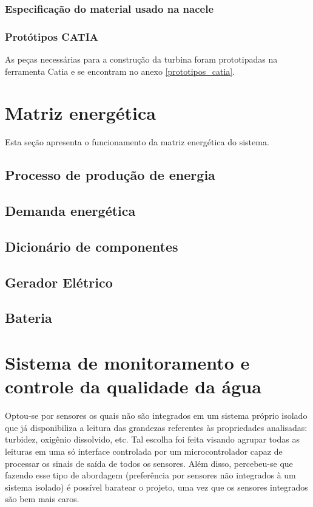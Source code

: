	\subsubsection{Especificação do material usado na nacele}
		
	\subsubsection{Protótipos CATIA}
	  As peças necessárias para a construção da turbina foram prototipadas na ferramenta Catia \textregistered  e se encontram no 
	  anexo \ref{prototipos_catia}.
  
  \vfill
  \pagebreak
  \section{Matriz energética}
      
      Esta seção apresenta o funcionamento da matriz energética do sistema.
      
  	\subsection{Processo de produção de energia}
  		
  	\subsection{Demanda energética}
  		
  	\subsection{Dicionário de componentes}
  		
  	\subsection{Gerador Elétrico}
  		
  	\subsection{Bateria}
  		
  
  \vfill
  \pagebreak
  \section{Sistema de monitoramento e controle da qualidade da água}
      
      Optou-se por sensores os quais não são integrados em um sistema próprio isolado que já disponibiliza a leitura das grandezas
      referentes às propriedades analisadas: turbidez, oxigênio dissolvido, etc. Tal escolha foi feita visando agrupar todas as
      leituras em uma só interface controlada por um microcontrolador capaz de processar os sinais de saída de todos os sensores.
      Além disso, percebeu-se que fazendo esse tipo de abordagem (preferência por sensores não integrados à um sistema isolado)
      é possível baratear o projeto, uma vez que os sensores integrados são bem mais caros.
    
